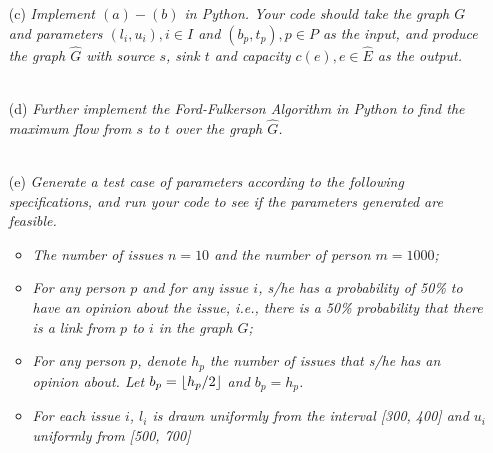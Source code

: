\documentclass[12pt]{article}
\DeclarePairedDelimiter\floor{\lfloor}{\rfloor}
\begin{document}
{\begin{enumerate}
\item[(c)]\textsl{Implement $(a)-(b)$ in Python. Your code should take the graph $G$ and parameters $(l_i, u_i), i \in I$ and $(b_p, t_p), p \in P$ as the input, and produce the graph $\hat{G}$ with source $s$, sink $t$ and capacity $c(e), e \in \hat{E}$ as the output.}\\ \\
\item[(d)]\textsl{Further implement the Ford-Fulkerson Algorithm in Python to find the maximum flow from $s$ to $t$ over the graph $\hat{G}$.}\\ \\
\item[(e)]\textsl{Generate a test case of parameters according to the following specifications, and run your code to see if the parameters generated are feasible.}
\begin{itemize}
  \item \textsl{The number of issues $n = 10$ and the number of person $m = 1000$;}
  \item \textsl{For any person $p$ and for any issue $i$, s/he has a probability of 50\% to have an opinion about the issue, i.e., there is a 50\% probability that there is a link from $p$ to $i$ in the graph $G$;}
  \item \textsl{For any person $p$, denote $h_p$ the number of issues that s/he has an opinion about. Let $b_p = \floor{h_p/2}$ and $b_p = h_p$.}
  \item \textsl{For each issue $i$, $l_i$ is drawn uniformly from the interval [300, 400] and $u_i$ uniformly from [500, 700]}
\end{itemize}
\end{enumerate}

}
\end{document}
